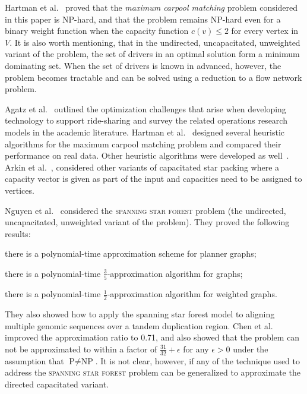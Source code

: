 \documentclass[draft]{article}
\def\CARPOOL{maximum carpool matching}
\begin{document}
Hartman et al.~\cite{hartman2013optimal} proved that the
\emph{\CARPOOL{}} problem considered in this paper is NP-hard,
and that the problem remains NP-hard even for a binary weight function when
the capacity function $c(v) \leq 2$ for every vertex in $V$.
It is also worth mentioning, that in the undirected, uncapacitated, unweighted
variant of the problem, the set of drivers in an optimal solution
form a minimum dominating set.
When the set of drivers is known in advanced, however, the problem becomes
tractable and can be solved using a reduction to a flow network problem.

Agatz et al.~\cite{agatz2012optimization} outlined the optimization challenges
that arise when developing technology to support ride-sharing and survey the
related operations research models in the academic literature.  
Hartman et al.~\cite{hartman2014theory} designed several heuristic algorithms
for the \CARPOOL{} problem and compared 
their performance on real data.
Other heuristic algorithms were developed as well~\cite{knapen2014exploiting}.
Arkin et al.~\cite{arkin2004approximations}, considered other variants of
capacitated star packing where a capacity vector is given as part of the input and 
capacities need to be assigned to vertices.  

Nguyen et al.~\cite{nguyen2008approximating} considered the \textsc{spanning star forest} problem
(the undirected, uncapacitated, unweighted variant of the problem).
They proved the following results:
\begin{enumerate*}
\item
there is a polynomial-time approximation scheme for planner graphs;
\item 
there is a polynomial-time $\frac{3}{5}$-approximation algorithm for graphs;
\item 
there is a polynomial-time $\frac{1}{2}$-approximation algorithm for weighted graphs.
\end{enumerate*}
They also showed how to apply the spanning star forest model to aligning multiple
genomic sequences over a tandem duplication region.
Chen et al.~\cite{chen2007improved} improved the approximation ratio to 0.71,
and also showed that the problem can not be approximated to within a factor of
$\frac{31}{32} + \epsilon$ for any $\epsilon > 0$ under the assumption 
that $\text{P} \neq \text{NP}$.
It is not clear, however, if any of the technique used to address the
\textsc{spanning star forest} problem can be generalized to approximate the
directed capacitated variant.
\end{document}
